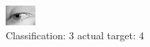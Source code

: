 \begin{figure}[h!]
\begin{center}
\includegraphics[width=0.60\columnwidth]{figures/ID3006_class_3_target_4.png}
\end{center}
\caption{ Classification: 3 actual target: 4}
\label{fig:ID3006_class_3_target_4}
\end{figure}
